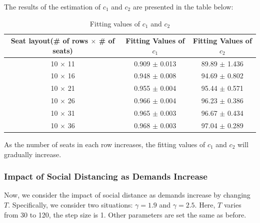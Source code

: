 The results of the estimation of $c_1$ and $c_2$ are presented in the table below:

\begin{table}[ht]
  \centering
  \caption{Fitting values of $c_1$ and $c_2$}
  \begin{tabular}{|c|c|c|}
  \hline
   Seat layout(\# of rows $\times$ \# of seats) & Fitting Values of $c_1$ & Fitting Values of $c_2$  \\
  \hline
   10 $\times$ 11 & 0.909 $\pm$ 0.013  & 89.89 $\pm$ 1.436 \\
   10 $\times$ 16 & 0.948 $\pm$ 0.008  & 94.69 $\pm$ 0.802 \\
   10 $\times$ 21 & 0.955 $\pm$ 0.004 & 95.44 $\pm$ 0.571 \\
   10 $\times$ 26 & 0.966 $\pm$ 0.004 & 96.23 $\pm$ 0.386 \\
   10 $\times$ 31 & 0.965 $\pm$ 0.003 & 96.67 $\pm$ 0.434 \\
   10 $\times$ 36 & 0.968 $\pm$ 0.003 & 97.04 $\pm$ 0.289 \\
   \hline
  \end{tabular}
\end{table}

As the number of seats in each row increases, the fitting values of $c_1$ and $c_2$ will gradually increase.




\subsubsection{Impact of Social Distancing as Demands Increase}
Now, we consider the impact of social distance as demands increase by changing $T$. Specifically, we consider two situations: $\gamma = 1.9$ and $\gamma = 2.5$. Here, $T$ varies from 30 to 120, the step size is 1. Other parameters are set the same as before.

